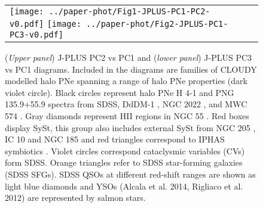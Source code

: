 \documentclass{article}
\newlength\figwidth
\begin{document}
\begin{figure}
\centering
\begin{tabular}{l l}
  \texttt{[image: ../paper-phot/Fig1-JPLUS-PC1-PC2-v0.pdf]}
   \texttt{[image: ../paper-phot/Fig2-JPLUS-PC1-PC3-v0.pdf]}
  \end{tabular}  
  \caption{(\textit{Upper panel}) J-PLUS PC2 vs PC1 and (\textit{lower panel}) J-PLUS PC3 vs PC1 diagrams. Included in the
diagrams are families of CLOUDY modelled halo PNe spanning a range of halo PNe properties (dark violet circle). Black circles represent halo PNe H 4-1 and PNG 135.9+55.9 spectra from SDSS, DdDM-1 \citep{Kwitter:1998}, NGC 2022 \citep{Kwitter:2003}, and MWC 574 \citep{Pereira:2007}. Gray diamonds represent HII regions in NGC 55 \citep{Magrini:2017}. Red boxes display \citet{Munari:2002} SySt, this group also includes external SySt from NGC 205 \citep{Goncalves:2015}, IC 10 \citep{Goncalves:2008} and NGC 185 \citep{Goncalves:2012} and red triangles correspond to IPHAS symbiotics \citep{Rodriguez:2014}. Violet circles correspond cataclysmic variables (CVs) form SDSS. Orange triangles refer to SDSS star-forming galaxies (SDSS SFGs). SDSS QSOs at different red-shift ranges are shown as light blue diamonds and  YSOs (Alcala et al. 2014, Rigliaco et al. 2012) are represented by salmon stars.}
\label{fig:PCA}
\end{figure}

 
   
\end{document}
